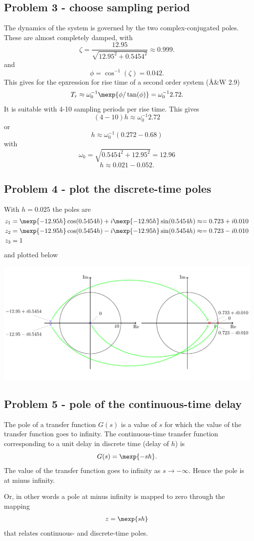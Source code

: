 \documentclass{scrartcl}
\begin{document}
\subsection*{Problem 3 - choose sampling period}
\label{sec-8-3}

   The dynamics of the system is governed by the two complex-conjugated poles. These are almost completely damped, with 
   \[ \zeta = \frac{12.95}{\sqrt{12.95^2 + 0.5454^2}} \approx 0.999. \]
   and
   \[ \phi = \cos^{-1}(\zeta) = 0.042. \] 
   This gives for the epxression for rise time of a second order system (Å\&W 2.9)
   \[ T_r \approx \omega_0^{-1}\mexp{\phi/\tan(\phi)} = \omega_0^{-1}2.72. \]
   It is suitable with 4-10 sampling periods per rise time. This gives
   \[ (4-10)h \approx \omega_0^{-1}2.72 \]
   or
   \[ h \approx \omega_0^{-1} (0.272 - 0.68) \]
   with 
   \[ \omega_0 = \sqrt{0.5454^2 + 12.95^2} = 12.96 \]
   \[ h \approx 0.021 - 0.052. \]
\subsection*{Problem 4 - plot the discrete-time poles}
\label{sec-8-4}

   With \(h=0.025\) the poles are 
   \begin{align*}
   z_1 &= \mexp{-12.95h}\cos(0.5454h) + i\mexp{-12.95h}\sin(0.5454h) \approx = 0.723 + i0.010\\
   z_2 &= \mexp{-12.95h}\cos(0.5454h) - i\mexp{-12.95h}\sin(0.5454h) \approx = 0.723 - i0.010\\
   z_3 &= 1
   \end{align*}
   and  plotted below
   \begin{center}
   \includegraphics[width=0.8\linewidth]{dt-poles}
   \end{center}
\subsection*{Problem 5 - pole of the continuous-time delay}
\label{sec-8-5}

   The pole of a transfer function $G(s)$ is a value of $s$ for which the value of the transfer function goes to infinity. The continuous-time transfer function corresponding to a unit delay in discrete time (delay of $h$) is 
   \[ G(s) = \mexp{-sh}. \]
   The value of the transfer function goes to infinity as \( s \to -\infty\). Hence the pole is at minus infinity.

   Or, in other words a pole at minus infinity is mapped to zero through the mapping 
   \[ z = \mexp{sh} \]
   that relates continuous- and discrete-time poles.
\end{document}
